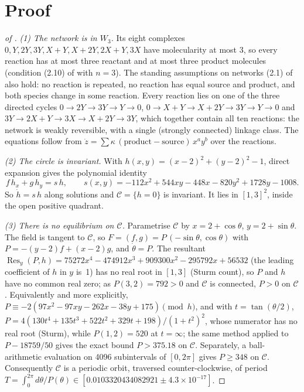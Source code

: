 \documentclass[11pt,a4paper]{report}
\begin{document}
\section{Proof}

\begin{proof}[of ]
\emph{(1) The network is in \(W_3\).} Its eight complexes \(0, Y, 2Y, 3Y, X+Y, X+2Y, 2X+Y, 3X\) have molecularity at most
3, so every reaction has at most three reactant and at most three product molecules (condition (2.10) of
\autocite{CraciunErban2025} with \(n=3\)). The standing assumptions on networks (2.1) of \autocite{CraciunErban2025}
also hold: no reaction is repeated, no reaction has equal source and product, and both species change in some
reaction. Every reaction lies on one of the three directed cycles
\(0\to2Y\to3Y\to Y\to0\), \(0\to X+Y\to X+2Y\to3Y\to Y\to0\) and \(3Y\to2X+Y\to3X\to X+2Y\to3Y\), which together contain
all ten reactions: the network is weakly reversible, with a single (strongly connected) linkage class. The
equations follow from \(\dot z=\sum\kappa\,(\text{product}-\text{source})\,x^ay^b\) over the reactions.

\emph{(2) The circle is invariant.} With \(h(x,y)=(x-2)^2+(y-2)^2-1\), direct expansion gives the polynomial identity
\[
f\,h_x+g\,h_y=s\,h,\qquad s(x,y)=-112x^2+544xy-448x-820y^2+1728y-1008 .
\]
So \(\dot h=s\,h\) along solutions and \(\mathcal C=\{h=0\}\) is invariant. It lies in \([1,3]^2\), inside the open
positive quadrant.

\emph{(3) There is no equilibrium on \(\mathcal C\).} Parametrise \(\mathcal C\) by \(x=2+\cos\theta\),
\(y=2+\sin\theta\). The field is tangent to \(\mathcal C\), so \(F=(f,g)=P\,(-\sin\theta,\cos\theta)\) with
\(P=-(y-2)f+(x-2)g\), and \(\dot\theta=P\). The resultant
\(\operatorname{Res}_y(P,h)=75272x^4-474912x^3+909300x^2-295792x+56532\) (the leading coefficient of \(h\) in \(y\)
is~1) has no real root in \([1,3]\) (Sturm count), so \(P\) and \(h\) have no common real zero; as \(P(3,2)=792>0\)
and \(\mathcal C\) is connected, \(P>0\) on \(\mathcal C\). Equivalently and more explicitly, \(P\equiv
-2(97x^2-97xy-262x-38y+175)\pmod h\), and with \(t=\tan(\theta/2)\),
\(P=4(130t^4+135t^3+522t^2+329t+198)/(1+t^2)^2\), whose numerator has no real root (Sturm), while \(P(1,2)=520\) at
\(t=\infty\); the same method applied to \(P-18759/50\) gives the exact bound \(P>375.18\) on \(\mathcal C\).
Separately, a ball-arithmetic evaluation on 4096 subintervals of \([0,2\pi]\) gives \(P\ge348\) on \(\mathcal C\).
Consequently
\(\mathcal C\) is a periodic orbit, traversed counter-clockwise, of period
\(T=\int_0^{2\pi}d\theta/P(\theta)\in[0.0103320434082921\pm4.3\times10^{-17}]\).


\end{proof}
\end{document}

